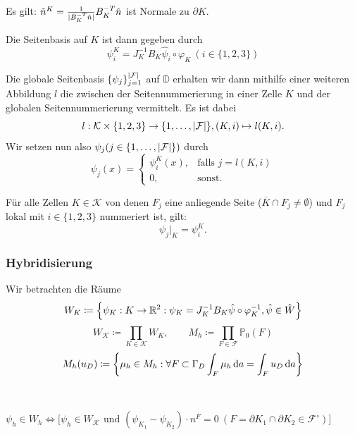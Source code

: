 \begin{Lemma}
	Es gilt: $\tilde{n}^K = \frac{1}{| B_K^{-T} \hat{n} |} B_K^{-T} \hat{n} $ ist Normale zu $ \partial K $.
\end{Lemma}

Die Seitenbasis auf $ K $ ist dann gegeben durch 
\[ \psi_i^K = J_K^{-1}B_K \hat{\psi}_i \circ \varphi_K \ (i\in \{1,2,3\}) \]

Die globale Seitenbasis $\{\psi_j\}_{j = 1}^{| \mathcal{F} |}$ auf $ \mathbb{D}  $ erhalten wir dann mithilfe einer weiteren Abbildung $l$ die zwischen der Seitennummerierung in einer Zelle $ K $ und der globalen Seitennummerierung vermittelt. Es ist dabei
\[ l:\mathcal{K}\times \{1,2,3\} \to \{1, \dots , | \mathcal{F} | \}, (K,i) \mapsto l(K,i). \]
Wir setzen nun also $ \psi_j (j \in \{1,\dots , | \mathcal{F} |\})$ durch
\[ \psi_j(x) = 
\begin{cases}
\psi_i^K(x) , &\text{falls } j = l(K,i)\\
0,			  &\text{sonst}.
\end{cases} \]
\begin{Bemerkung}
	Für alle Zellen $ K \in \mathcal{K} $ von denen $ F_j $ eine anliegende Seite ($ \overline{K} \cap F_j \ne \emptyset $) und $ F_j $ lokal mit $ i \in \{1,2,3\} $ nummeriert ist, gilt:
	\[ \psi_j|_K = \psi_i^K. \]
\end{Bemerkung}

\subsubsection{Hybridisierung}

Wir betrachten die Räume
\[W_K \coloneqq \left\{ \psi_K:K \to \mathbb{R}^2: \psi_K = J_K^{-1}  B_K \hat{\psi} \circ \varphi_K^{-1}, \hat{\psi} \in \hat{W} \right\} \]
\[ W_\mathcal{K} \coloneqq \prod_{K \in \mathcal{K}} W_K, \qquad M_h \coloneqq \prod_{F \in \mathcal{F}} \mathbb{P}_0(F) \]
\[ M_h(u_D) \coloneqq \left\{ \mu_h \in M_h:\forall  F \subset \Gamma_D \int_F \mu_h \, \mathrm{d} a = \int_F u_D \, \mathrm{d} a  \right\}\]

\begin{Bemerkung}~
	
	$ \psi_h \in W_h \iff \big[ \psi_h \in W_{\mathcal{K}} \text{ und }  (\psi_{K_1} - \psi_{K_2}) \cdot n^F = 0 \ (F= \partial K_1 \cap \partial K_2 \in \mathcal{F}^{\circ})\big] $
\end{Bemerkung}


